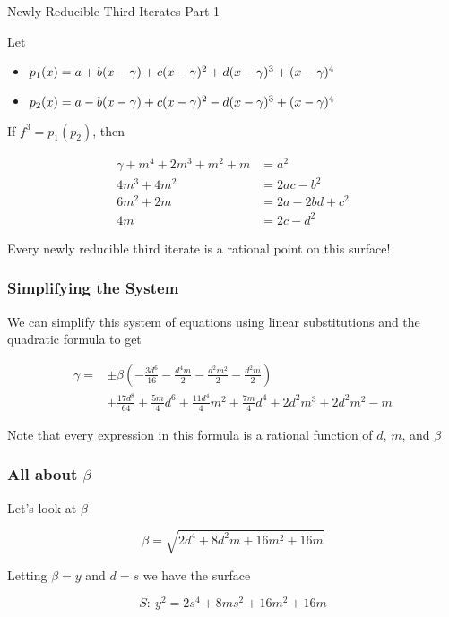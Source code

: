 \begin{frame}[allowframebreaks]{Newly Reducible Third Iterates Part 1}


Let

  \begin{itemize}
    \item $p_1(x) = a + b (x-\gamma) + c (x-\gamma)^{2} + d(x-\gamma)^{3} + (x-\gamma)^{4}$
    \item $p_2(x) = a - b (x-\gamma) + c (x-\gamma)^{2} - d (x-\gamma)^{3} + (x-\gamma)^{4}$
  \end{itemize}

If $f^3 = p_1(p_2)$, then

\begin{align*}
\gamma + m^{4} + 2 m^{3} + m^{2} + m &= a^2 \\
4 m^{3} + 4 m^{2} &= 2ac - b^2 \\
6 m^{2} + 2 m &= 2a - 2bd + c^2 \\
4 m &= 2c - d^{2}
\end{align*}

\framebreak

Every newly reducible third iterate is a rational point on this surface!

\end{frame}

\begin{frame}
\frametitle{Simplifying the System}

We can simplify this system of equations using linear substitutions and the quadratic formula to get

\begin{align*}
\gamma= & \pm\beta \left(- \frac{3 d^{6}}{16} - \frac{d^{4} m}{2} - \frac{d^{2} m^{2}}{2} - \frac{d^{2} m}{2}\right) \\
& + \frac{17 d^{8}}{64} + \frac{5 m}{4} d^{6} + \frac{11 d^{4}}{4} m^{2} + \frac{7 m}{4} d^{4} + 2 d^{2} m^{3} + 2 d^{2} m^{2} - m
\end{align*}

\pause

Note that every expression in this formula is a rational function of $d$, $m$, and $\beta$

\end{frame}

\begin{frame}
\frametitle{All about $\beta$}

Let's look at $\beta$

\begin{equation*}
\beta = \sqrt{2 d^{4} + 8 d^{2} m + 16 m^{2} + 16 m}
\end{equation*}

\pause 

Letting $\beta = y$ and $d = s$ we have the surface

\begin{equation*}
S:\ y^2 = 2 s^4 + 8 m s^2 + 16 m^2 + 16 m
\end{equation*}

\end{frame}

